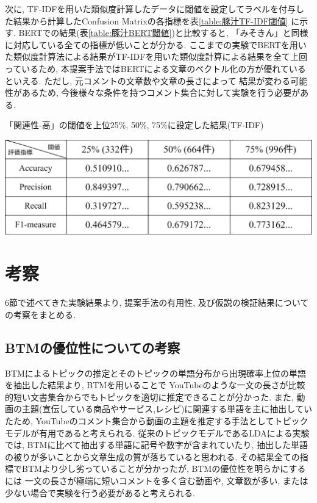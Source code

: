 \documentclass{ltjarticle}
\begin{document}
次に, TF-IDFを用いた類似度計算したデータに閾値を設定してラベルを付与した結果から計算したConfusion Matrixの各指標を表\ref{table:豚汁TF-IDF閾値}
に示す. BERTでの結果(表\ref{table:豚汁BERT閾値})と比較すると, 「みそきん」と同様に対応している全ての指標が低いことが分かる. 
ここまでの実験でBERTを用いた類似度計算法による結果がTF-IDFを用いた類似度計算による結果を全て上回っているため, 
本提案手法ではBERTによる文章のベクトル化の方が優れているといえる. ただし, 元コメントの文章数や文章の長さによって
結果が変わる可能性があるため, 今後様々な条件を持つコメント集合に対して実験を行う必要がある. 
\begin{table}[ht]
    \centering
    \caption{「関連性-高」の閾値を上位25\%, 50\%, 75\%に設定した結果(TF-IDF)}
    \vspace{5truept}

    \includegraphics[width = 13.5cm]{images/豚汁images/豚汁TF-IDF閾値.drawio.png}
    \label{table:豚汁TF-IDF閾値}
\end{table}

\newpage
\section{考察}
6節で述べてきた実験結果より, 提案手法の有用性, 及び仮説の検証結果についての考察をまとめる. 
\subsection{BTMの優位性についての考察}
BTMによるトピックの推定とそのトピックの単語分布から出現確率上位の単語を抽出した結果より, BTMを用いることで
YouTubeのような一文の長さが比較的短い文書集合からでもトピックを適切に推定できることが分かった. 
また, 動画の主題(宣伝している商品やサービス,レシピ)に関連する単語を主に抽出していたため, 
YouTubeのコメント集合から動画の主題を推定する手法としてトピックモデルが有用であると考えられる. 
従来のトピックモデルであるLDAによる実験では, BTMに比べて抽出する単語に記号や数字が含まれていたり, 
抽出した単語の被りが多いことから文章生成の質が落ちていると思われる. 
その結果全ての指標でBTMより少し劣っていることが分かったが, BTMの優位性を明らかにするには
一文の長さが極端に短いコメントを多く含む動画や, 文章数が多い, または少ない場合で実験を行う必要があると考えられる. 
\end{document}
